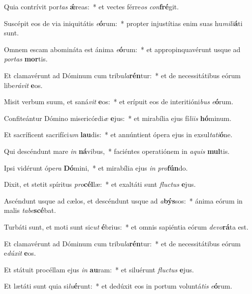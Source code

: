\item Quia contrívit por\textit{tas} \textbf{ǽ}reas:~* et vectes férre\textit{os} \textit{con}\textbf{fré}git.
\item Suscépit eos de via iniquitátis \textit{e}\textbf{ó}rum:~* propter injustítias enim suas hu\textit{mi}\textit{li}\textbf{á}ti sunt.
\item Omnem escam abomináta est ánima \textit{e}\textbf{ó}rum:~* et appropinquavérunt usque ad \textit{por}\textit{tas} \textbf{mor}tis.
\item Et clamavérunt ad Dóminum cum tribu\textit{la}\textbf{rén}tur:~* et de necessitátibus eórum libe\textit{rá}\textit{vit} \textbf{e}os.
\item Misit verbum suum, et saná\textit{vit} \textbf{e}os:~* et erípuit eos de interitióni\textit{bus} \textit{e}\textbf{ó}rum.
\item Confiteántur Dómino misericórdi\textit{æ} \textbf{e}jus:~* et mirabília ejus fí\textit{li}\textit{is} \textbf{hó}minum.
\item Et sacríficent sacrifíci\textit{um} \textbf{lau}dis:~* et annúntient ópera ejus in exsul\textit{ta}\textit{ti}\textbf{ó}ne.
\item Qui descéndunt mare \textit{in} \textbf{ná}vibus,~* faciéntes operatiónem in \textit{a}\textit{quis} \textbf{mul}tis.
\item Ipsi vidérunt ópe\textit{ra} \textbf{Dó}mini,~* et mirabília ejus \textit{in} \textit{pro}\textbf{fún}do.
\item Dixit, et stetit spíritus \textit{pro}\textbf{cél}læ:~* et exaltáti sunt \textit{fluc}\textit{tus} \textbf{e}jus.
\item Ascéndunt usque ad cælos, et descéndunt usque ad \textit{a}\textbf{býs}sos:~* ánima eórum in malis \textit{ta}\textit{be}\textbf{scé}bat.
\item Turbáti sunt, et moti sunt sic\textit{ut} \textbf{é}brius:~* et omnis sapiéntia eórum \textit{de}\textit{vo}\textbf{rá}ta est.
\item Et clamavérunt ad Dóminum cum tribu\textit{la}\textbf{rén}tur:~* et de necessitátibus eórum e\textit{dú}\textit{xit} \textbf{e}os.
\item Et státuit procéllam ejus \textit{in} \textbf{au}ram:~* et siluérunt \textit{fluc}\textit{tus} \textbf{e}jus.
\item Et lætáti sunt quia si\textit{lu}\textbf{é}runt:~* et dedúxit eos in portum voluntá\textit{tis} \textit{e}\textbf{ó}rum.
